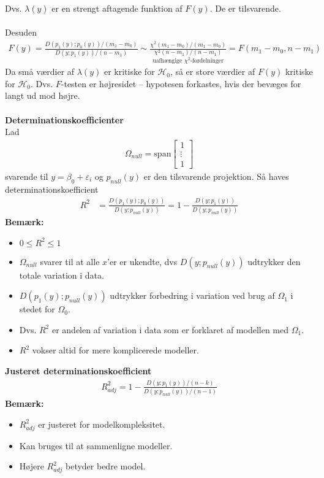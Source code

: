 \documentclass[12pt,a4paper]{report}
\begin{document}
Dvs. $\lambda(y)$ er en strengt aftagende funktion af $F(y)$. De er tilsvarende.\\\\
Desuden
\begin{align*}
F(y)=\frac{D(p_1(y);p_0(y))/(m_1-m_0)}{D(y;p_1(y))/(n-m_1)}\sim\underset{\text{uafhængige }\chi^2\text{-fordelninger}}{\frac{\chi^2(m_1-m_0)/(m_1-m_0)}{\chi^2(n-m_1)/(n-m_1)}}=F(m_1-m_0,n-m_1)
\end{align*}
Da små værdier af $\lambda(y)$ er kritiske for $\mathcal{H}_0$, så er store værdier af $F(y)$ kritiske for $\mathcal{H}_0$. Dvs. $F$-testen er højresidet -- hypotesen forkastes, hvis der bevæges for langt ud mod højre.\\\\
\textbf{Determinationskoefficienter}\\
Lad
\begin{align*}
\Omega_{null}=\text{span}\begin{bmatrix}1\\\vdots\\1\end{bmatrix}
\end{align*}
svarende til $y=\beta_0+\varepsilon_i$ og $p_{null}(y)$ er den tilsvarende projektion. Så haves determinationskoefficient
\begin{align*}
R^2&=\frac{D(p_1(y);p_0(y))}{D(y;p_{null}(y))}=1-\frac{D(y;p_1(y))}{D(y;p_{null}(y))}
\end{align*}
\textbf{Bemærk:}
\begin{itemize}
\item $0\leq R^2\leq1$
\item $\Omega_{null}$ svarer til at alle $x$'er er ukendte, dvs $D(y;p_{null}(y))$ udtrykker den totale variation i data.
\item $D(p_1(y);p_{null}(y))$ udtrykker forbedring i variation ved brug af $\Omega_1$ i stedet for $\Omega_0$.
\item Dvs. $R^2$ er andelen af variation i data som er forklaret af modellen med $\Omega_1$.
\item $R^2$ vokser altid for mere komplicerede modeller.
\end{itemize}
\textbf{Justeret determinationskoefficient}
\begin{align*}
R_{adj}^2=1-\frac{D(y;p_1(y))/(n-k)}{D(y;p_{null}(y))/(n-1)}
\end{align*}
\textbf{Bemærk:}
\begin{itemize}
\item $R^2_{adj}$ er justeret for modelkompleksitet.
\item Kan bruges til at sammenligne modeller.
\item Højere $R^2_{adj}$ betyder bedre model.
\end{itemize}
\end{document}
